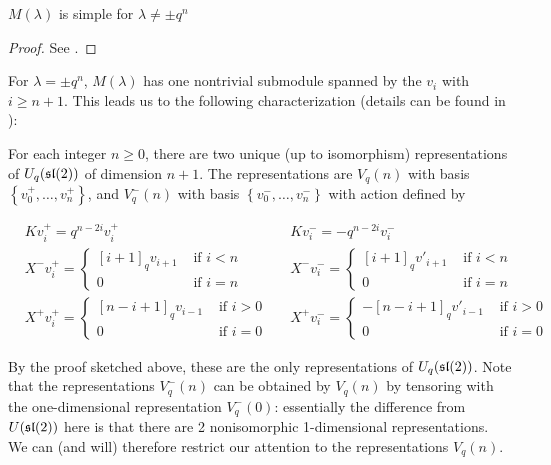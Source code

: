 \begin{claim}
    $M(\lambda)$ is simple for $\lambda \neq \pm q^n$
\end{claim}

\begin{proof}
    See \cite{Jantzen1995}.
\end{proof}

For $\lambda = \pm q^{n}$, $M(\lambda)$ has one nontrivial submodule spanned by the $v_i$ with $i \geq n+1$.
This leads us to the following characterization (details can be found in \cite{Jantzen1995}):


For each integer $n \geq 0$, there are two unique (up to isomorphism)
representations of $U_q(\mathfrak{sl}(2))$ of dimension $n+1$. 
The representations are $V_q(n)$ with basis $\left\{ v^+_0, \ldots, v^+_n
\right\}$, and $V_q^-(n)$ with basis $\left\{ v^-_0, \ldots, v^-_n \right\}$
with action defined by 

\begin{align*}
    &K v^+_i = q^{n-2i} v^+_i  &
    &K v^-_i = -q^{n-2i} v^-_i \\
    &X^- v^+_i = \begin{cases} [i+1]_qv_{i+1}& \text{ if $i < n$} \\ 0& \text{ if $i = n$} \end{cases} &
    &X^- v^-_i = \begin{cases} [i+1]_qv'_{i+1}& \text{ if $i < n$} \\ 0& \text{ if $i = n$} \end{cases} \\
    & X^+  v^+_i = \begin{cases} 
                     [n-i+1]_qv_{i-1}& \text{ if $i > 0$} \\ 
                    0& \text{ if $i = 0$} 
             \end{cases} &
    & X^+  v^-_i = \begin{cases} 
                    -[n-i+1]_q v'_{i-1}& \text{ if $i > 0$} \\ 
                    0& \text{ if $i = 0$} 
             \end{cases}
\end{align*}

By the proof sketched above, these are the only representations of
$U_q(\mathfrak{sl}(2))$.  Note that the representations $V_q^-(n)$ can be obtained by
$V_q(n)$ by tensoring with the one-dimensional representation $V_q^-(0)$:
essentially the difference from $U(\mathfrak{sl}(2))$ here is that there are 2
nonisomorphic 1-dimensional representations. We can (and will) therefore
restrict our attention to the representations $V_q(n)$.

